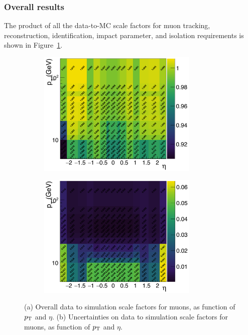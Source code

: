 \subsubsection{Overall results}
The product of all the data-to-MC scale factors for muon tracking, reconstruction, identification, impact parameter, and isolation requirements is shown in Figure~\ref{fig:MuonIDEff_5}. 

\begin{figure}[tbh]
\centering
\begin{subfigure}{0.45\textwidth}
\centering
\includegraphics[width=3in]{Figures/Muons/mu_sf.pdf}
\caption{}
\end{subfigure}
\begin{subfigure}{0.45\textwidth}
\centering
\includegraphics[width=3in]{Figures/Muons/mu_sf_unc.pdf}
\caption{}
\end{subfigure}
    \caption{(a) Overall data to simulation scale factors for muons, as function of $p_{\rm{T}}$ and $\eta$. (b) Uncertainties on  data to simulation scale factors for muons, as function of $p_{\rm{T}}$ and $\eta$.}
    \label{fig:MuonIDEff_5}
\end{figure}



